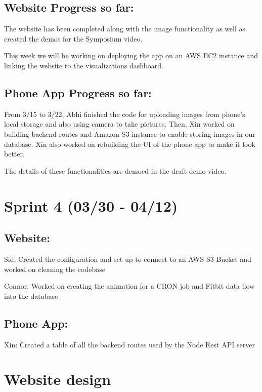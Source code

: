 \documentclass[]{book}
\begin{document}
\subsection{Website Progress so far:}\label{website-progress-so-far}

The website has been completed along with the image functionality as
well as created the demos for the Symposium video.

This week we will be working on deploying the app on an AWS EC2 instance
and linking the website to the visualizations dashboard.

\subsection{Phone App Progress so
far:}\label{phone-app-progress-so-far-1}

From 3/15 to 3/22, Abhi finished the code for uploading images from
phone's local storage and also using camera to take pictures. Then, Xin
worked on building backend routes and Amazon S3 instance to enable
storing images in our database. Xin also worked on rebuilding the UI of
the phone app to make it look better.

The details of these functionalities are demoed in the draft demo video.

\section{Sprint 4 (03/30 - 04/12)}\label{sprint-4-0330---0412}

\subsection{Website:}\label{website-1}

Sid: Created the configuration and set up to connect to an AWS S3 Bucket
and worked on cleaning the codebase

Connor: Worked on creating the animation for a CRON job and Fitbit data
flow into the database

\subsection{Phone App:}\label{phone-app-1}

Xin: Created a table of all the backend routes used by the Node Rest API
server

\section{Website design}\label{website-design}
\end{document}
